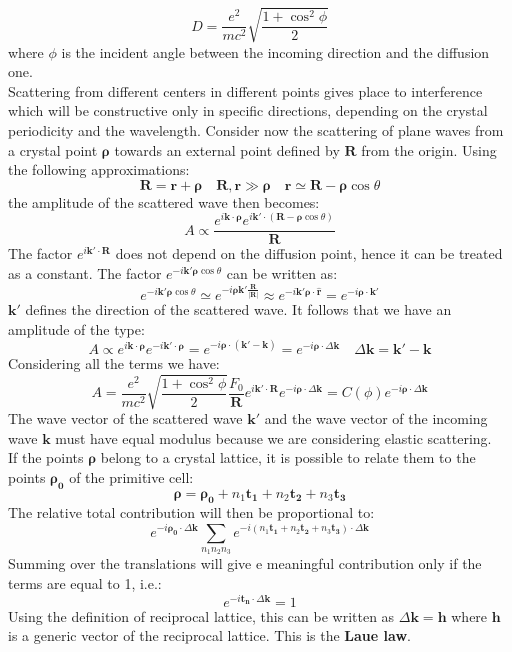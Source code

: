 \documentclass[10.75pt,a4paper,openright,bottom=2cm]{article}
\renewcommand{\Vec}[1]{\boldsymbol{#1}}
\begin{document}
\[
D=\frac{e^2}{mc^2}\sqrt{\frac{1+\cos^2\phi}{2}}
\]
where $\phi$ is the incident angle between the incoming direction and the diffusion one.\\
Scattering from different centers in different points gives place to interference which will be constructive only in specific directions, depending on the crystal periodicity and the wavelength. Consider now the scattering of plane waves from a crystal point $\Vec{\rho}$ towards an external point defined by $\Vec{R}$ from the origin. Using the following approximations:
\[
\Vec{R}=\Vec{r}+\Vec{\rho} \quad \Vec{R},\Vec{r}\gg\Vec{\rho} \quad \Vec{r}\simeq\Vec{R}-\Vec{\rho}\cos\theta
\]
the amplitude of the scattered wave then becomes:
\[
A\propto\frac{e^{i\Vec{k}\cdot\Vec{\rho}}e^{i\Vec{k'}\cdot(\Vec{R}-\Vec{\rho}\cos\theta)}}{\Vec{R}}
\]
The factor $e^{i\Vec{k'}\cdot\Vec{R}}$ does not depend on the diffusion point, hence it can be treated as a constant. The factor $e^{-i\Vec{k'}\Vec{\rho}\cos\theta}$ can be written as:
\[
e^{-i\Vec{k'}\Vec{\rho}\cos\theta}\simeq e^{-i\Vec{\rho}\Vec{k'}\frac{\Vec{R}}{|\Vec{R}|}}\approx e^{-i\Vec{k'}\Vec{\rho}\cdot\Vec{\hat{r}}}=e^{-i\Vec{\rho}\cdot\Vec{k}'}
\]
$\Vec{k}'$ defines the direction of the scattered wave. It follows that we have an amplitude of the type:
\[
A\propto e^{i\Vec{k}\cdot\Vec{\rho}}e^{-i\Vec{k}'\cdot\Vec{\rho}}=e^{-i\Vec{\rho}\cdot(\Vec{k}'-\Vec{k})}=e^{-i\Vec{\rho}\cdot\Delta\Vec{k}} \quad \Delta\Vec{k}=\Vec{k}'-\Vec{k}
\]
Considering all the terms we have:
\[
A=\frac{e^2}{mc^2}\sqrt{\frac{1+\cos^2\phi}{2}}\frac{F_0}{\Vec{R}}e^{i\Vec{k'}\cdot\Vec{R}}e^{-i\Vec{\rho}\cdot\Delta\Vec{k}}=C(\phi)e^{-i\Vec{\rho}\cdot\Delta\Vec{k}}
\]
The wave vector of the scattered wave $\Vec{k}'$ and the wave vector of the incoming wave $\Vec{k}$ must have equal modulus because we are considering elastic scattering.\\
If the points $\Vec{\rho}$ belong to a crystal lattice, it is possible to relate them to the points $\Vec{\rho_0}$ of the primitive cell:
\[
\Vec{\rho}=\Vec{\rho_0}+n_1\Vec{t_1}+n_2\Vec{t_2}+n_3\Vec{t_3}
\]
The relative total contribution will then be proportional to:
\begin{equation}
\label{rhozero}
e^{-i\Vec{\rho_0}\cdot\Delta\Vec{k}}\sum_{n_1n_2n_3}e^{-i(n_1\Vec{t_1}+n_2\Vec{t_2}+n_3\Vec{t_3})\cdot\Delta\Vec{k}}
\end{equation}
Summing over the translations will give e meaningful contribution only if the terms are equal to 1, i.e.:
\[
e^{-i\Vec{t_n}\cdot\Delta\Vec{k}}=1
\]
Using the definition of reciprocal lattice, this can be written as $\Delta\Vec{k}=\Vec{h}$ where $\Vec{h}$ is a generic vector of the reciprocal lattice. This is the \textbf{Laue law}.\\
\end{document}

